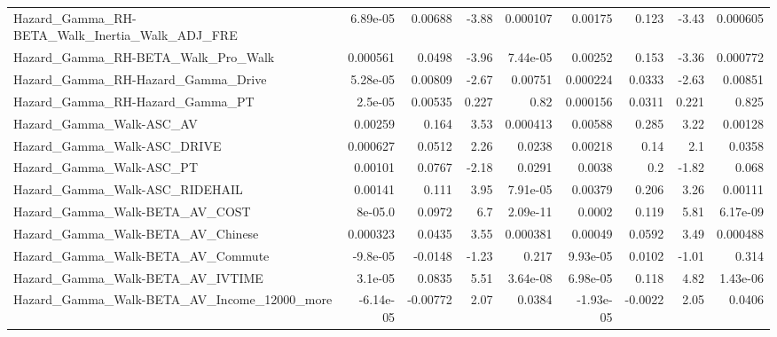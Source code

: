 \begin{tabular}{lrrrrrrrr}
Hazard\_Gamma\_RH-BETA\_Walk\_Inertia\_Walk\_ADJ\_FRE     &    6.89e-05 &      0.00688 &    -3.88 & 0.000107 &    0.00175 &       0.123 &        -3.43 &      0.000605 \\
Hazard\_Gamma\_RH-BETA\_Walk\_Pro\_Walk                 &    0.000561 &       0.0498 &    -3.96 & 7.44e-05 &    0.00252 &       0.153 &        -3.36 &      0.000772 \\
Hazard\_Gamma\_RH-Hazard\_Gamma\_Drive                 &    5.28e-05 &      0.00809 &    -2.67 &  0.00751 &   0.000224 &      0.0333 &        -2.63 &       0.00851 \\
Hazard\_Gamma\_RH-Hazard\_Gamma\_PT                    &     2.5e-05 &      0.00535 &    0.227 &     0.82 &   0.000156 &      0.0311 &        0.221 &         0.825 \\
Hazard\_Gamma\_Walk-ASC\_AV                           &     0.00259 &        0.164 &     3.53 & 0.000413 &    0.00588 &       0.285 &         3.22 &       0.00128 \\
Hazard\_Gamma\_Walk-ASC\_DRIVE                        &    0.000627 &       0.0512 &     2.26 &   0.0238 &    0.00218 &        0.14 &          2.1 &        0.0358 \\
Hazard\_Gamma\_Walk-ASC\_PT                           &     0.00101 &       0.0767 &    -2.18 &   0.0291 &     0.0038 &         0.2 &        -1.82 &         0.068 \\
Hazard\_Gamma\_Walk-ASC\_RIDEHAIL                     &     0.00141 &        0.111 &     3.95 & 7.91e-05 &    0.00379 &       0.206 &         3.26 &       0.00111 \\
Hazard\_Gamma\_Walk-BETA\_AV\_COST                     &     8e-05.0 &       0.0972 &      6.7 & 2.09e-11 &     0.0002 &       0.119 &         5.81 &      6.17e-09 \\
Hazard\_Gamma\_Walk-BETA\_AV\_Chinese                  &    0.000323 &       0.0435 &     3.55 & 0.000381 &    0.00049 &      0.0592 &         3.49 &      0.000488 \\
Hazard\_Gamma\_Walk-BETA\_AV\_Commute                  &    -9.8e-05 &      -0.0148 &    -1.23 &    0.217 &   9.93e-05 &      0.0102 &        -1.01 &         0.314 \\
Hazard\_Gamma\_Walk-BETA\_AV\_IVTIME                   &     3.1e-05 &       0.0835 &     5.51 & 3.64e-08 &   6.98e-05 &       0.118 &         4.82 &      1.43e-06 \\
Hazard\_Gamma\_Walk-BETA\_AV\_Income\_12000\_more        &   -6.14e-05 &     -0.00772 &     2.07 &   0.0384 &  -1.93e-05 &     -0.0022 &         2.05 &        0.0406 \\

\end{tabular}
